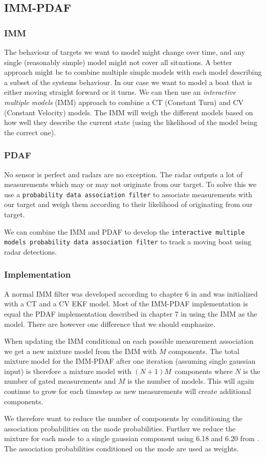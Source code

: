 \subsection{IMM-PDAF}
\subsubsection{IMM}
The behaviour of targets we want to model might change over time, and any single (reasonably simple) model might not cover all situations. A better approach might be to combine multiple simple models with each model describing a subset of the systems behaviour. In our case we want to model a boat that is either moving straight forward or it turns. We can then use an \textit{interactive multiple models} (IMM) approach to combine a CT (Constant Turn) and CV (Constant Velocity) models. The IMM will weigh the different models based on how well they describe the current state (using the likelihood of the model being the correct one).

\subsubsection{PDAF}
No sensor is perfect and radars are no exception. The radar outputs a lot of measurements which may or may not originate from our target. To solve this we use a \texttt{probability data association filter} to associate measurements with our target and weigh them according to their likelihood of originating from our target.

We can combine the IMM and PDAF to develop the \texttt{interactive multiple models probability data association filter} to track a moving boat using radar detections.

\subsubsection{Implementation}
A normal IMM filter was developed according to chapter 6 in \cite{edmund} and was initialized with a CT and a CV EKF model. Most of the IMM-PDAF implementation is equal the PDAF implementation described in chapter 7 in \cite{edmund} using the IMM as the model. There are however one difference that we should emphasize. 

When updating the IMM conditional on each possible measurement association we get a new mixture model from the IMM with $M$ components. The total mixture model for the IMM-PDAF after one iteration (assuming single gaussian input) is therefore a mixture model with $(N+1)M$ components where $N$ is the number of gated measurements and $M$ is the number of models. This will again continue to grow for each timestep as new measurements will create additional components.

We therefore want to reduce the number of components by conditioning the association probabilities on the mode probabilities. Further we reduce the mixture for each mode to a single gaussian component using 6.18 and 6.20 from \cite{edmund}. The association probabilities conditioned on the mode are used as weights. 



